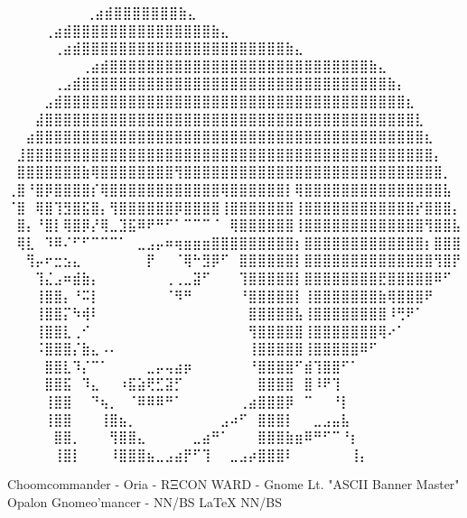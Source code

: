 \iffalse
⠀⠀⠀⠀⠀⠀             ⠀⠀⢀⣴⣾⣿⣿⣿⣿⣿⣿⣿⣷⣄⠀⠀⠀⠀⠀⠀⠀⠀
⠀⠀⠀  ⠀      ⠀⠀⠀⠀⢀⣴⣾⣿⣿⣿⣿⣿⣿⣿⣿⣿⣿⣿⣿⣿⣿⣿⣷⣄⠀⠀⠀⠀⠀⠀⠀⠀
⠀⠀ ⠀   ⠀⠀⠀⠀⠀⢀⣴⣾⣿⣿⣿⣿⣿⣿⣿⣿⣿⣿⣿⣿⣿⣿⣿⣿⣿⣿⣿⣿⣿⣿⣷⣄⠀⠀⠀⠀⠀⠀⠀⠀
⠀⠀⠀⠀⠀⠀⠀⠀⢀⣴⣾⣿⣿⣿⣿⣿⣿⣿⣿⣿⣿⣿⣿⣿⣿⣿⣿⣿⣿⣿⣿⣿⣿⣿⣿⣿⣿⣿⣿⣷⣄⠀⠀⠀⠀⠀⠀⠀⠀
⠀⠀⠀⠀⠀⢀⣠⣾⣿⣿⣿⣿⣿⣿⣿⣿⣿⣿⣿⣿⣿⣿⣿⣿⣿⣿⣿⣿⣿⣿⣿⣿⣿⣿⣿⣿⣿⣿⣿⣿⣿⣷⡄⠀⠀⠀⠀⠀⠀
⠀⠀⠀⠀⣠⣾⣿⣿⣿⣿⣿⣿⣿⣿⣿⣿⣿⣿⣿⣿⣿⣿⣿⣿⣿⣿⣿⣿⣿⣿⣿⣿⣿⣿⣿⣿⣿⣿⣿⣿⣿⣿⣿⣆⠀⠀⠀⠀⠀
⠀⠀⠀⣼⣿⣿⣿⣿⣿⣿⣿⣿⣿⣿⣿⣿⣿⣿⣿⣿⣿⣿⣿⣿⣿⣿⣿⣿⣿⣿⣿⣿⣿⣿⣿⣿⣿⣿⣿⣿⣿⣿⣿⣿⣇⠀⠀⠀⠀
⠀⠀⣴⣿⣿⣿⣿⣿⣿⣿⣿⣿⣿⣿⣿⣿⣿⣿⣿⣿⣿⣿⣿⣿⣿⣿⣿⣿⣿⣿⣿⣿⣿⣿⣿⣿⣿⣿⣿⣿⣿⣿⣿⣿⣿⣆⠀⠀⠀
⠀⣸⣿⣿⣿⣿⣿⣿⣿⣿⣿⣿⣿⣿⣿⣿⣿⣿⣿⣿⣿⣿⣿⣿⣿⣿⣿⣿⣿⣿⣿⣿⣿⣿⣿⣿⣿⣿⣿⣿⣿⣿⣿⣿⣿⣿⡄⠀⠀
⠀⣿⣿⣿⣿⣿⣿⣿⣷⢿⣿⣿⣿⣿⣿⣿⣿⣿⢻⣿⣿⣿⣿⣿⣿⣿⣿⣿⣿⣿⣿⣿⣿⣿⣿⣿⣿⣿⣿⣿⣿⣿⣿⣿⣿⣿⣿⡀⠀
⢀⣿⠘⣿⡿⣿⣿⣿⣿⡎⢿⣿⣿⣿⣿⣿⣿⣿⣿⣿⣿⣿⣿⢿⣿⣿⣿⣿⣿⣿⡇⢿⣿⣿⣿⣿⣿⣿⣿⣿⣿⣿⣿⣿⣿⣿⣿⣧⠀
⠈⣿⠀⢿⣿⢹⣻⣿⣯⣿⡄⢻⣿⣿⣿⣿⣿⣿⡿⣿⣿⣿⣿⢸⣿⣿⣿⣿⣿⣿⣿⢸⣿⣿⣿⣿⣿⣿⣿⣿⣿⣿⣿⣿⡞⣿⣿⣿⡄
⠀⣿⡄⠘⣿⡇⢿⣿⡿⡜⢿⣀⣹⣯⠿⠟⠛⠋⠁⠉⠉⠉⠈⠀⢿⣿⣿⣿⣿⣿⣿⢸⣿⣿⣿⣿⣿⣿⣿⣿⣿⣿⣿⣿⣿⢻⣿⣿⣧
⠀⢿⣇⠀⠹⠿⠌⠋⠋⠉⠉⠉⠁⠀⣀⣠⡤⠶⢶⣶⣶⣶⣿⣿⣿⣿⣿⣿⣿⣿⣿⡆⣿⣿⣿⣿⣿⣿⣿⣿⣿⣿⣿⣿⣿⡆⣿⣿⣿
⠀⠀⢻⡤⠖⣒⣢⣄⠀⠀⠀⠀⠀⠀⠀⡟⠀⠀⠈⢿⠓⣻⡿⠋⠀⣿⣿⣿⣿⣿⣿⡇⣿⣿⣿⣿⣿⣿⣿⣿⣿⣿⣿⣿⣿⣿⢻⣿⡟
⠀⠀⠀⢹⣌⣠⠶⣾⣷⡄⠀⠀⠀⠀⠀⠀⠀⢀⢀⣀⣽⠋⠀⠀⠀⢹⣿⣿⣿⣿⣿⡇⣿⣿⣿⣿⣿⣿⣿⣿⣟⣿⣿⣿⣿⣿⠿⠋⠀
⠀⠀⠀⢸⣿⣿⡄⠘⠭⡇⠀⠀⠀⠀⠀⠀⠀⠈⠻⠛⠀⠀⠀⠀⠀⠘⣿⣿⣿⣿⣿⡇⢸⣿⣿⣿⣿⣿⣿⣿⣷⢿⣿⣿⣿⠟⠀⠀⠀
⠀⠀⠀⢸⣿⣿⡍⠳⢾⠇⠀⠀⠀⠀⠀⠀⠀⠀⠀⠀⠀⠀⠀⠀⠀⠀⣿⣿⣿⣿⣿⣧⢸⣿⣿⣿⣿⣿⣿⣿⣿⠸⢛⠟⠁⠀⠀⠀⠀
⠀⠀⠀⢸⣿⣿⣇⢀⠊⠀⠀⠀⠀⠀⠀⠀⠀⠀⠀⠀⠀⠀⠀⠀⠀⠀⢻⣿⣿⣿⣿⣿⢸⣿⣿⣿⣿⣿⣿⣿⢿⠔⠁⠀⠀⠀⠀⠀⠀
⠀⠀⠀⠨⣿⣿⣿⡌⣷⣄⠠⠄⠀⠀⠀⠀⠀⠀⠀⠀⠀⠀⠀⠀⠀⠀⢸⣿⣿⣿⣿⣿⢸⣿⣿⣿⣿⣿⠿⠋⠀⠀⠀⠀⠀⠀⠀⠀⠀
⠀⠀⠀⠀⣿⣿⣇⠹⡌⠉⠁⠀⠀⠀⠀⣀⡤⢤⣴⡶⠀⠀⠀⠀⠀⠀⠘⣿⣿⣿⣿⠋⣾⢹⣿⣿⠋⠁⠀⠀⠀⠀⠀⠀⠀⠀⠀⠀⠀
⠀⠀⠀⠀⣿⣿⣯⠀⠹⣄⠀⠀⠰⣯⣵⢟⣋⣽⡋⠀⠀⠀⠀⠀⠀⠀⠀⣿⣿⣿⣿⠀⣿⠸⠟⢹⠀⠀⠀⠀⠀⠀⠀⠀⠀⠀⠀⠀⠀
⠀⠀⠀⠀⢸⣿⣿⠀⠀⠙⢦⡀⠀⠈⠿⠿⠿⠛⠁⠀⠀⠀⠀⠀⠀⢀⣴⣿⣿⣿⡿⠀⠉⠀⠀⠘⡇⠀⠀⠀⠀⠀⠀⠀⠀⠀⠀⠀⠀
⠀⠀⠀⠀⢸⣿⣿⠀⠀⠀⢸⣿⣦⡀⠀⠀⠀⠀⠀⠀⠀⠀⠀⣠⠴⠋⠀⣿⣿⣿⡇⠀⠀⣀⣠⣤⣧⠀⠀⠀⠀⠀⠀⠀⠀⠀⠀⠀⠀
⠀⠀⠀⠀⠀⣿⣿⡀⠀⠀⠀⢻⣿⣿⣄⠀⠀⠀⠀⠀⣀⣴⠛⠁⠀⠀⠀⣿⣿⣿⣷⣶⠿⠛⠋⠉⠘⡆⠀⠀⠀⠀⠀⠀⠀⠀⠀⠀⠀
⠀⠀⠀⠀⠀⢸⣿⡇⠀⠀⠀⠸⣿⣿⣿⣦⣀⣠⣴⡟⠋⢹⠀⠀⣀⣠⡴⣿⣿⣿⠇⠀⠀⠀⠀⠀⠀⢸⡄⠀⠀⠀⠀⠀⠀⠀⠀⠀⠀

Choomcommander - Oria - RΞCON WARD - Gnome Lt. "ASCII Banner Master"
             Opalon Gnomeo'mancer - NN/BS LaTeX{} NN/BS


